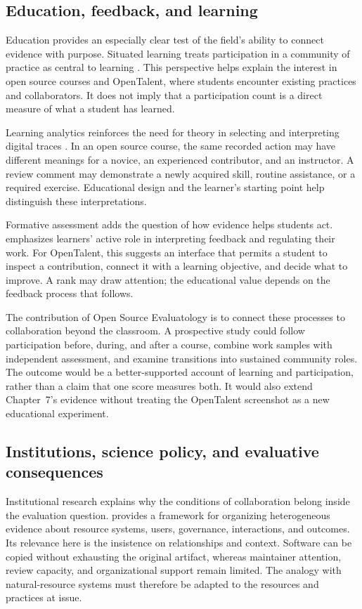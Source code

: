 \subsection{Education, feedback, and learning}
Education provides an especially clear test of the field's ability to connect evidence with purpose. Situated learning treats participation in a community of practice as central to learning \citep{lave1991}. This perspective helps explain the interest in open source courses and OpenTalent, where students encounter existing practices and collaborators. It does not imply that a participation count is a direct measure of what a student has learned.

Learning analytics reinforces the need for theory in selecting and interpreting digital traces \citep{wise2015}. In an open source course, the same recorded action may have different meanings for a novice, an experienced contributor, and an instructor. A review comment may demonstrate a newly acquired skill, routine assistance, or a required exercise. Educational design and the learner's starting point help distinguish these interpretations.

Formative assessment adds the question of how evidence helps students act. \citet{nicol2006} emphasizes learners' active role in interpreting feedback and regulating their work. For OpenTalent, this suggests an interface that permits a student to inspect a contribution, connect it with a learning objective, and decide what to improve. A rank may draw attention; the educational value depends on the feedback process that follows.

The contribution of Open Source Evaluatology is to connect these processes to collaboration beyond the classroom. A prospective study could follow participation before, during, and after a course, combine work samples with independent assessment, and examine transitions into sustained community roles. The outcome would be a better-supported account of learning and participation, rather than a claim that one score measures both. It would also extend Chapter~7's evidence without treating the OpenTalent screenshot as a new educational experiment.

\subsection{Institutions, science policy, and evaluative consequences}
Institutional research explains why the conditions of collaboration belong inside the evaluation question. \citet{ostrom2009} provides a framework for organizing heterogeneous evidence about resource systems, users, governance, interactions, and outcomes. Its relevance here is the insistence on relationships and context. Software can be copied without exhausting the original artifact, whereas maintainer attention, review capacity, and organizational support remain limited. The analogy with natural-resource systems must therefore be adapted to the resources and practices at issue.

